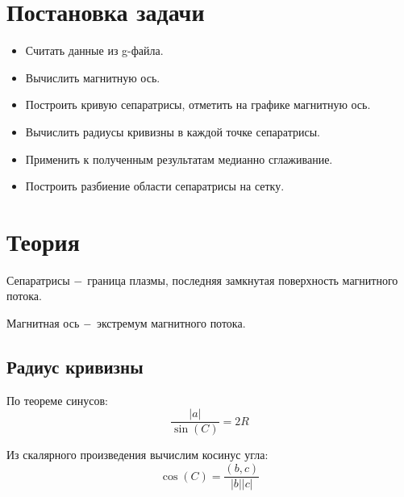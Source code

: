 \documentclass[a4]{article}
\renewcommand{\listoffigures}{\begingroup %
\tocsection
\tocfile{\listfigurename}{lof}
\endgroup}
\begin{document}
\newpage
\pagestyle{plain}



\newpage
\tableofcontents{}
\newpage
\listoffigures{}
\newpage

\section{Постановка задачи}
\begin{itemize}
    \item Считать данные из g-файла.

\item Вычислить магнитную ось.

\item Построить кривую сепаратрисы, отметить на графике магнитную ось.

\item Вычислить радиусы кривизны в каждой точке сепаратрисы.

\item Применить к полученным результатам медианно сглаживание.

\item Построить разбиение области сепаратрисы на сетку.
\end{itemize}


\section{Теория}
Сепаратрисы $\--$ граница плазмы, последняя замкнутая поверхность магнитного потока.

Магнитная ось $\--$ экстремум магнитного потока.
\subsection{Радиус кривизны}
По теореме синусов:
\begin{equation}
    \frac{\vert a\vert}{\sin(C)}=2R
\end{equation}

Из скалярного произведения вычислим косинус угла: 
\begin{equation}
    \cos(C)=\frac{(b,c)}{\vert b\vert \vert c\vert}
\end{equation}
\end{document}
